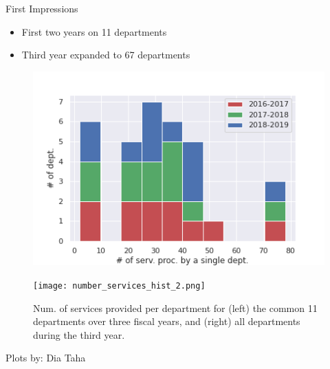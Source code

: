 \documentclass[compress]{beamer}
\begin{document}
\begin{frame}{First Impressions}



\begin{itemize}
    \item First two years on 11 departments
    \item Third year expanded to 67 departments
\end{itemize}


\begin{figure}
\centering
\begin{minipage}{0.5\textwidth}
  \centering
  \includegraphics[width=\linewidth]{number_services_hist_1.png}
\end{minipage}%
\begin{minipage}{.5\textwidth}
  \centering
  \texttt{[image: number\_services\_hist\_2.png]}
\end{minipage}
\caption{\small{Num. of services provided per department for (left) the common 11 departments over three fiscal years, and (right) all departments during the third year.}}
\end{figure}

\hfill\tiny{Plots by: Dia Taha}



    
\end{frame}
\end{document}
